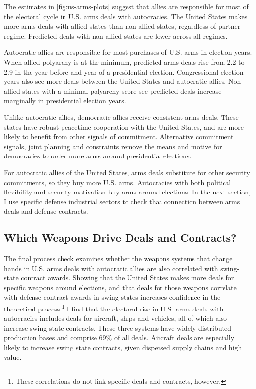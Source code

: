 \documentclass[12pt]{article}
\begin{document}
The estimates in \autoref{fig:us-arms-plots} suggest that allies are responsible for most of the electoral cycle in U.S. arms deals with autocracies. 
The United States makes more arms deals with allied states than non-allied states, regardless of partner regime. 
Predicted deals with non-allied states are lower across all regimes. 


Autocratic allies are responsible for most purchases of U.S. arms in election years. 
When allied polyarchy is at the minimum, predicted arms deals rise from 2.2 to 2.9 in the year before and year of a presidential election. 
Congressional election years also see more deals between the United States and autocratic allies. 
Non-allied states with a minimal polyarchy score see predicted deals increase marginally in presidential election years.


Unlike autocratic allies, democratic allies receive consistent arms deals. 
These states have robust peacetime cooperation with the United States, and are more likely to benefit from other signals of commitment.
Alternative commitment signals, joint planning and constraints remove the means and motive for democracies to order more arms around presidential elections.


For autocratic allies of the United States, arms deals substitute for other security commitments, so they buy more U.S. arms. 
Autocracies with both political flexibility and security motivation buy arms around elections. 
In the next section, I use specific defense industrial sectors to check that connection between arms deals and defense contracts. 



\subsection{Which Weapons Drive Deals and Contracts?} 


The final process check examines whether the weapons systems that change hands in U.S. arms deals with autocratic allies are also correlated with swing-state contract awards. 
Showing that the United States makes more deals for specific weapons around elections, and that deals for those weapons correlate with defense contract awards in swing states increases confidence in the theoretical process.\footnote{These correlations do not link specific deals and contracts, however.}
I find that the electoral rise in U.S. arms deals with autocracies includes deals for aircraft, ships and vehicles, all of which also increase swing state contracts. 
These three systems have widely distributed production bases and comprise 69\% of all deals. 
Aircraft deals are especially likely to increase swing state contracts, given dispersed supply chains and high value. 
\end{document}
